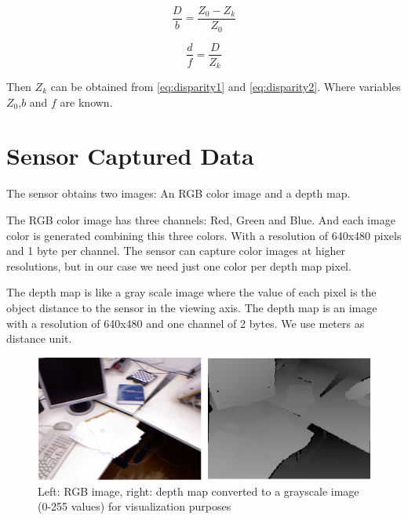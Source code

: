\begin{equation}
\label{eq:disparity1}
 \frac{D}{b} = \frac{Z_0 - Z_k}{Z_0} 
\end{equation}


\begin{equation}
\label{eq:disparity2}
 \frac{d}{f} = \frac{D}{Z_k} 
\end{equation}

Then $Z_k$ can be obtained from \ref{eq:disparity1} and \ref{eq:disparity2}. Where variables $Z_0$,$b$ and $f$ are known.

\section{Sensor Captured Data}

The sensor obtains two images: An RGB color image and a depth map.

The RGB color image has three channels: Red, Green and Blue. And each image color is generated 
combining this three colors. With a resolution of 640x480 pixels and 1 byte per channel. The sensor can 
capture color images at higher resolutions, but in our case we need just one color per depth map pixel.

The depth map is like a gray scale image where the value of each pixel is the object distance to the sensor in the viewing axis. 
The depth map is an image with a resolution of 640x480 and one channel of 2 bytes. We use meters as distance unit.

\begin{figure}[h!]
\begin{center}
\includegraphics[scale=0.3]{images/color_depth.png}
\caption{Left: RGB image, right: depth map converted to a grayscale image (0-255 values) for visualization purposes}
\label{fig:colordepth}
\end{center}
\end{figure}


